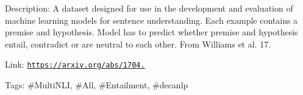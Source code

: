 Description\+: A dataset designed for use in the development and evaluation of machine learning models for sentence understanding. Each example contains a premise and hypothesis. Model has to predict whether premise and hypothesis entail, contradict or are neutral to each other. From Williams et al. \textquotesingle{}17.

Link\+: \href{https://arxiv.org/abs/1704.05426}{\tt https\+://arxiv.\+org/abs/1704.}

Tags\+: \#\+Multi\+N\+LI, \#\+All, \#\+Entailment, \#decanlp 